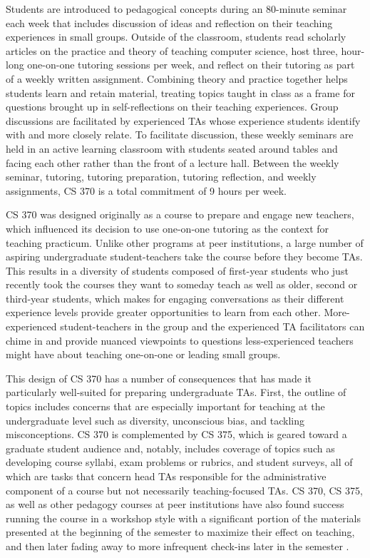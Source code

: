 Students are introduced to pedagogical concepts during an 80-minute seminar each week that includes discussion of ideas and reflection on their teaching experiences in small groups. Outside of the classroom, students read scholarly articles on the practice and theory of teaching computer science, host three, hour-long one-on-one tutoring sessions per week, and reflect on their tutoring as part of a weekly written assignment. Combining theory and practice together helps students learn and retain material, treating topics taught in class as a frame for questions brought up in self-reflections on their teaching experiences. Group discussions are facilitated by experienced TAs whose experience students identify with and more closely relate. To facilitate discussion, these weekly seminars are held in an active learning classroom with students seated around tables and facing each other rather than the front of a lecture hall. Between the weekly seminar, tutoring, tutoring preparation, tutoring reflection, and weekly assignments, CS 370 is a total commitment of 9 hours per week.

CS 370 was designed originally as a course to prepare and engage new teachers, which influenced its decision to use one-on-one tutoring as the context for teaching practicum. Unlike other programs at peer institutions, a large number of aspiring undergraduate student-teachers take the course before they become TAs. This results in a diversity of students composed of first-year students who just recently took the courses they want to someday teach as well as older, second or third-year students, which makes for engaging conversations as their different experience levels provide greater opportunities to learn from each other. More-experienced student-teachers in the group and the experienced TA facilitators can chime in and provide nuanced viewpoints to questions less-experienced teachers might have about teaching one-on-one or leading small groups.

This design of CS 370 has a number of consequences that has made it particularly well-suited for preparing undergraduate TAs. First, the outline of topics includes concerns that are especially important for teaching at the undergraduate level such as diversity, unconscious bias, and tackling misconceptions. CS 370 is complemented by CS 375, which is geared toward a graduate student audience and, notably, includes coverage of topics such as developing course syllabi, exam problems or rubrics, and student surveys, all of which are tasks that concern head TAs responsible for the administrative component of a course but not necessarily teaching-focused TAs. CS 370, CS 375, as well as other pedagogy courses at peer institutions have also found success running the course in a workshop style with a significant portion of the materials presented at the beginning of the semester to maximize their effect on teaching, and then later fading away to more infrequent check-ins later in the semester \cite{Roberts:1995}.

